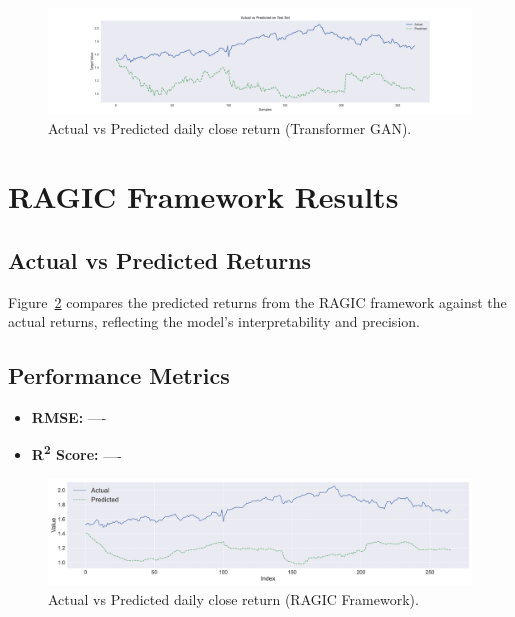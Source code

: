 \begin{figure}[h!]
    \centering
    \includegraphics[width=\textwidth]{Images/_8_ActualVsPred_c.pdf}
    \caption{Actual vs Predicted daily close return (Transformer GAN).}
    \label{fig:tgan_actual_vs_pred}
\end{figure}

\section{RAGIC Framework Results}
\subsection{Actual vs Predicted Returns}
Figure~\ref{fig:ragic_actual_vs_pred} compares the predicted returns from the RAGIC framework against the actual returns, reflecting the model’s interpretability and precision.

\subsection{Performance Metrics}
\begin{itemize}
    \item \textbf{RMSE:} ----
    \item \textbf{R\textsuperscript{2} Score:} ----
\end{itemize}

\begin{figure}[h!]
    \centering
    \includegraphics[width=\textwidth]{Images/9_Act_vs_Pred_Point.pdf}
    \caption{Actual vs Predicted daily close return (RAGIC Framework).}
    \label{fig:ragic_actual_vs_pred}
\end{figure}

